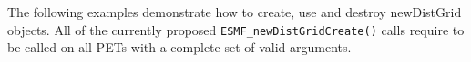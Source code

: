 
The following examples demonstrate how to create, use and destroy newDistGrid objects. All of the currently proposed {\tt ESMF\_newDistGridCreate()} calls require to be called on all PETs with a complete set of valid arguments.

